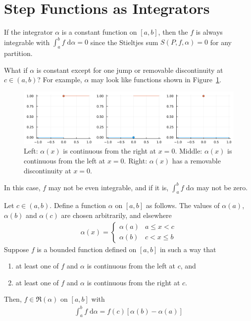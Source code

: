\documentclass[thmcnt=section, 12pt]{my-elegantbook}
\begin{document}
\section{Step Functions as Integrators}

\par If the integrator $\alpha$ is a constant function on $[a, b]$, then the $f$ is always integrable with $\int_{a}^{b} f\; \mathrm{d}\alpha = 0$ since the Stieltjes sum $S(P,f,\alpha) = 0$ for any partition.

\par What if $\alpha$ is constant except for one jump or removable discontinuity at $c \in (a, b)$? For example, $\alpha$ may look like functions shown in Figure~\ref{fig:9}.

\begin{figure}[ht]
    \centering
    \includegraphics[scale=0.2]{figures/step-func-integrator.png}
    \caption{Left: $\alpha(x)$ is continuous from the right at $x=0$. Middle: $\alpha(x)$ is continuous from the left at $x=0$. Right: $\alpha(x)$ has a removable discontinuity at $x=0$.}
    \label{fig:9}
\end{figure}

\noindent In this case, $f$ may not be even integrable, and if it is, $\int_{a}^{b} f \; \mathrm{d}\alpha$ may not be zero.

\begin{theorem} \label{thm:24}
    Let $c \in (a, b)$. Define a function $\alpha$ on $[a, b]$ as follows. The values of $\alpha(a)$, $\alpha(b)$ and $\alpha(c)$ are chosen arbitrarily, and elsewhere
    \begin{align*}
        \alpha(x) = \begin{cases}
                        \alpha(a) & a \leq x < c \\
                        \alpha(b) & c < x \leq b
                    \end{cases}
    \end{align*}
    Suppose $f$ is a bounded function defined on $[a, b]$ in such a way that
    \begin{enumerate}
        \item at least one of $f$ and $\alpha$ is continuous from the left at $c$, and
        \item at least one of $f$ and $\alpha$ is continuous from the right at $c$.
    \end{enumerate}
    Then, $f \in \mathfrak{R}(\alpha)$ on $[a, b]$ with
    \begin{align}
        \int_{a}^{b} f \; \mathrm{d}\alpha
        = f(c) [\alpha(b) - \alpha(a)]
        \label{eq:40}
    \end{align}
\end{theorem}
\end{document}
